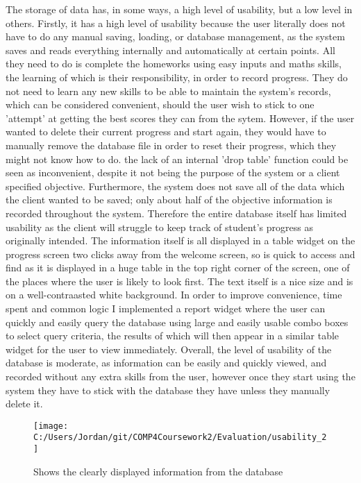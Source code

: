 The storage of data has, in some ways, a high level of usability, but a low level in others. Firstly, it has a high level of usability because the user literally does not have to do any manual saving, loading, or database management, as the system saves and reads everything internally and automatically at certain points. All they need to do is complete the homeworks using easy inputs and maths skills, the learning of which is their responsibility, in order to record progress. They do not need to learn any new skills to be able to maintain the system's records, which can be considered convenient, should the user wish to stick to one 'attempt' at getting the best scores they can from the sytem. However, if the user wanted to delete their current progress and start again, they would have to manually remove the database file in order to reset their progress, which they might not know how to do. the lack of an internal 'drop table' function could be seen as inconvenient, despite it not being the purpose of the system or a client specified objective. Furthermore, the system does not save all of the data which the client wanted to be saved; only about half of the objective information is recorded throughout the system. Therefore the entire database itself has limited usability as the client will struggle to keep track of student's progress as originally intended. The information itself is all displayed in a table widget on the progress screen two clicks away from the welcome screen, so is quick to access and find as it is displayed in a huge table in the top right corner of the screen, one of the places where the user is likely to look first. The text itself is a nice size and is on a well-contraasted white background. In order to improve convenience, time spent and common logic I implemented a report widget where the user can quickly and easily query the database using large and easily usable combo boxes to select query criteria, the results of which will then appear in a similar table widget for the user to view immediately. Overall, the level of usability of the database is moderate, as information can be easily and quickly viewed, and recorded without any extra skills from the user, however once they start using the system they have to stick with the database they have unless they manually delete it.

\begin{figure}[H]
	\texttt{[image: C:/Users/Jordan/git/COMP4Coursework2/Evaluation/usability\_2]}
	\caption{Shows the clearly displayed information from the database}
\end{figure}

